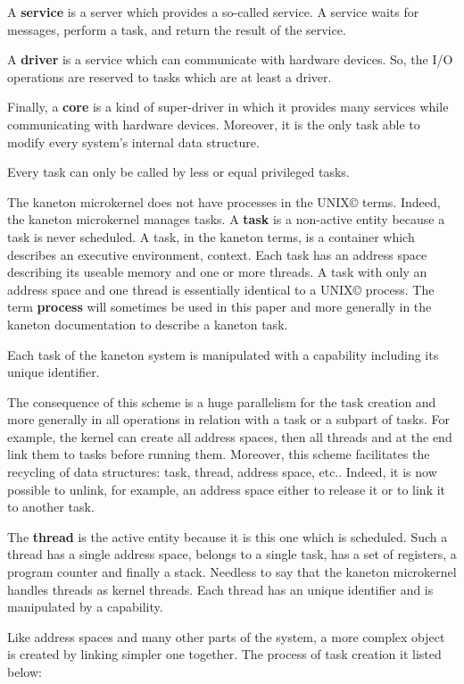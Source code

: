 \begin{multicols}{2}
A \textbf{service} is a server which provides a so-called service. A service
waits for messages, perform a task, and return the result of the service.

A \textbf{driver} is a service which can communicate with hardware devices.
So, the I/O operations are reserved to tasks which are at least a driver.

Finally, a \textbf{core} is a kind of super-driver in which it provides
many services while communicating with hardware devices. Moreover, it is
the only task able to modify every system's internal data structure.

Every task can only be called by less or equal privileged tasks.

The kaneton microkernel does not have processes in the
UNIX{\scriptsize \copyright} terms. Indeed, the kaneton microkernel manages
tasks. A \textbf{task} is a non-active entity because a task is never scheduled.
A task, in the kaneton terms, is a container which describes an executive
environment, context. Each task has an address space describing its useable
memory and one or more threads. A task with only an address space and one
thread is essentially identical to a UNIX{\scriptsize \copyright} process.
The term \textbf{process} will sometimes be used in this paper and more
generally in the kaneton documentation to describe a kaneton task.

Each task of the kaneton system is manipulated with a capability including
its unique identifier.

The consequence of this scheme is a huge parallelism for the
task creation and more generally in all operations in relation with
a task or a subpart of tasks. For example, the kernel can create all
address spaces, then all threads and at the end link them to tasks before
running them. Moreover, this scheme facilitates the recycling of data
structures: task, thread, address space, etc.. Indeed, it is now possible to
unlink, for example, an address space either to release it or to link it to
another task.

The \textbf{thread} is the active entity because it is this one which is
scheduled. Such a thread has a single address space, belongs to a single
task, has a set of registers, a program counter and finally a stack.
Needless to say that the kaneton microkernel handles threads as kernel threads.
Each thread has an unique identifier and is manipulated by a capability.

Like address spaces and many other parts of the system, a more complex
object is created by linking simpler one together. The process of task creation
it listed below:


\end{multicols}
